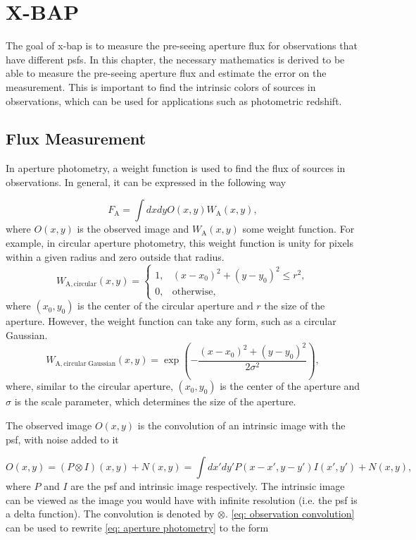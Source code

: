 \chapter{X-BAP}\label{ch: x-bap}

The goal of \gls{x-bap} is to measure the pre-seeing aperture flux for observations that have different \glspl{psf}. In this chapter, the necessary mathematics is derived to be able to measure the pre-seeing aperture flux and estimate the error on the measurement. This is important to find the intrinsic colors of sources in observations, which can be used for applications such as photometric redshift.


\section{Flux Measurement}\label{subsec: flux measurement}

In aperture photometry, a weight function is used to find the flux of sources in observations. In general, it can be expressed in the following way

\begin{equation}\label{eq: aperture photometry}
    F_\mathrm{A} = \int dxdyO(x,y)W_\mathrm{A}(x,y),
\end{equation}
where $O(x,y)$ is the observed image and $W_\mathrm{A}(x,y)$ some weight function. For example, in circular aperture photometry, this weight function is unity for pixels within a given radius and zero outside that radius.
\[
W_\mathrm{A,circular}(x,y) =
\begin{cases}
1, & (x-x_0)^2+ (y-y_0)^2 \le r^2, \\
0, & \mathrm{otherwise},
\end{cases}
\]
where $(x_0, y_0)$ is the center of the circular aperture and $r$ the size of the aperture. However, the weight function can take any form, such as a circular Gaussian. 
\begin{equation}
    W_\mathrm{A,circular\;Gaussian}(x,y)=
\exp\left(
-\frac{(x-x_0)^2+(y-y_0)^2}{2\sigma^2}
\right),
\end{equation}
where, similar to the circular aperture, $(x_0, y_0)$ is the center of the aperture and $\sigma$ is the scale parameter, which determines the size of the aperture.

The observed image $O(x,y)$ is the convolution of an intrinsic image with the \gls{psf}, with noise added to it

\begin{equation}\label{eq: observation convolution}
    O(x,y)=(P\otimes I)(x,y)+N(x,y) = \int dx'dy'P(x-x', y-y')I(x',y')+N(x,y),
\end{equation}
where $P$ and $I$ are the \gls{psf} and intrinsic image respectively. The intrinsic image can be viewed as the image you would have with infinite resolution (i.e. the \gls{psf} is a delta function). The convolution is denoted by $\otimes$.
\autoref{eq: observation convolution} can be used to rewrite \autoref{eq: aperture photometry} to the form

